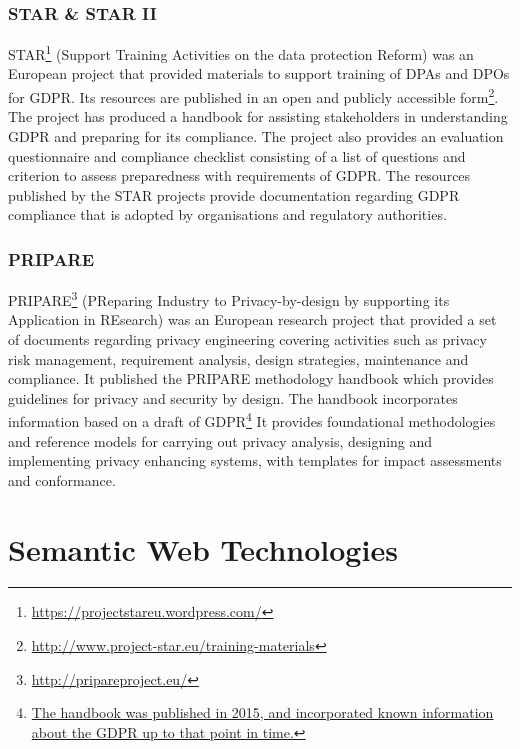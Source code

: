 \subsubsection{STAR \& STAR II}
STAR\footnote{\url{https://projectstareu.wordpress.com/}} (Support Training Activities on the data protection Reform) was an European project that provided materials to support training of DPAs and DPOs for GDPR.
Its resources are published in an open and publicly accessible form\footnote{\url{http://www.project-star.eu/training-materials}}. The project has produced a handbook for assisting stakeholders in understanding GDPR and preparing for its compliance. The project also provides an evaluation questionnaire and compliance checklist \cite{GDPR_compliance_checklist_STAR} consisting of a list of questions and criterion to assess preparedness with requirements of GDPR. 
The resources published by the STAR projects provide documentation regarding GDPR compliance that is adopted by organisations and regulatory authorities.

\subsubsection{PRIPARE}
PRIPARE\footnote{\url{http://pripareproject.eu/}} (PReparing Industry to Privacy-by-design by supporting its Application in REsearch) was an European research project that provided a set of documents regarding privacy engineering covering activities such as privacy risk management, requirement analysis, design strategies, maintenance and compliance. It published the PRIPARE methodology handbook \cite{noauthor_privacy_2015} which provides  guidelines for privacy and security by design. The handbook incorporates information based on a draft of GDPR\footnote{\url{The handbook was published in 2015, and incorporated known information about the GDPR up to that point in time.}} It provides foundational methodologies and reference models for carrying out privacy analysis, designing and implementing privacy enhancing systems, with templates for impact assessments and conformance. 

\section{Semantic Web Technologies}\label{sec:background:semweb}

